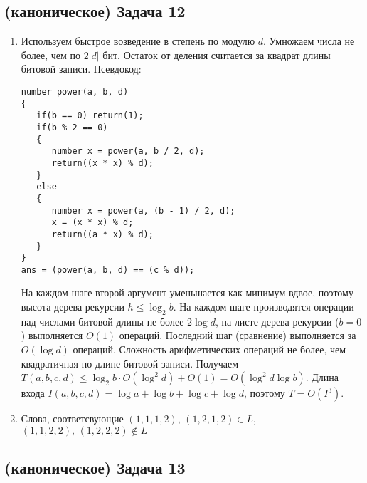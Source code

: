 \documentclass[a4paper]{article}
\begin{document}
\begin{enumerate}
\subsection*{(каноническое) Задача 12}
\begin{enumerate}
\item Используем быстрое возведение в степень по модулю $d$. Умножаем числа не более, чем по $2|d|$ бит. Остаток от деления считается за квадрат длины битовой записи. Псевдокод:
\begin{lstlisting}
number power(a, b, d)
{
   if(b == 0) return(1);
   if(b % 2 == 0)
   {
      number x = power(a, b / 2, d);
      return((x * x) % d);
   }
   else
   {
      number x = power(a, (b - 1) / 2, d);
      x = (x * x) % d;
      return((a * x) % d);
   }
}
ans = (power(a, b, d) == (c % d));
\end{lstlisting}
На каждом шаге второй аргумент уменьшается как минимум вдвое, поэтому высота дерева рекурсии $h\leqslant \log_2 b$. На каждом шаге производятся операции над числами битовой длины не более $2\log d$, на листе дерева рекурсии ($b=0$) выполняется $O(1)$ операций. Последний шаг (сравнение) выполняется за $O(\log d)$ операций. Сложность арифметических операций не более, чем квадратичная по длине битовой записи.\newline
Получаем $T(a, b, c, d)\leqslant \log_2 b\cdot O(\log^2 d)+O(1)=O(\log^2 d\log b)$. Длина входа $I(a,b,c,d)=\log a+\log b+\log c+\log d$, поэтому $T=O(I^3)$.
\item Слова, соответсвующие $(1,1,1,2),\,(1,2,1,2)\in L$, $(1,1,2,2),\,(1,2,2,2)\notin L$
\end{enumerate}
\end{enumerate}
\subsection*{(каноническое) Задача 13}
\end{document}
